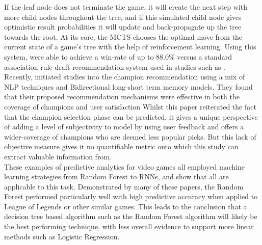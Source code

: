If the leaf node does not terminate the game, it will create the next step with more child nodes throughout the tree, and if this simulated child node gives optimistic result probabilities it will update and back-propagate up the tree towards the root.
At its core, the \ac{MCTS} chooses the optimal move from the current state of a game's tree with the help of reinforcement learning.
Using this system, \citet{chen2018art} were able to achieve a win-rate of up to 88.0\% versus a standard association rule draft recommendation system used in studies such as \citet{hanke2017moba}. \\

Recently, \citet{shen2022deep} initiated studies into the champion recommendation using a mix of \ac{NLP} techniques and Bidirectional long-short term memory models.
They found that their proposed recommendation mechanisms were effective in both the coverage of champions and user satisfaction
Whilst this paper reiterated the fact that the champion selection phase can be predicted, it gives a unique perspective of adding a level of subjectivity to model by using user feedback and offers a wider-coverage of champions who are deemed less popular picks.
But this lack of objective measure gives it no quantifiable metric onto which this study can extract valuable information from. \\

These examples of predictive analytics for video games all employed machine learning strategies from Random Forest to \ac{RNN}s, and show that all are applicable to this task.
Demonstrated by many of these papers, the Random Forest performed particularly well with high predictive accuracy when applied to League of Legends or other similar games.
This leads to the conclusion that a decision tree based algorithm such as the Random Forest algorithm will likely be the best performing technique, with less overall evidence to support more linear methods such as Logistic Regression.

